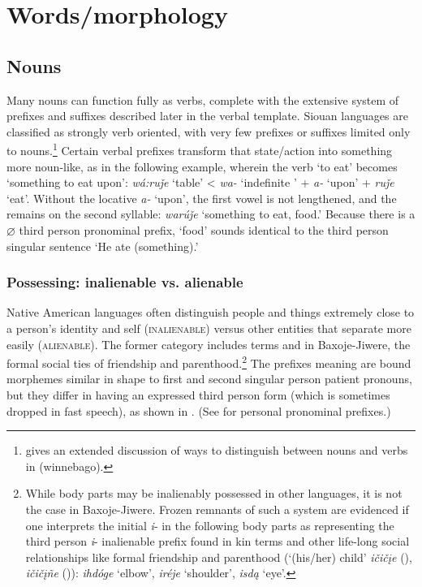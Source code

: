 \documentclass[output=paper]{LSP/langsci}
\begin{document}
\section{Words/morphology}
\subsection{Nouns}  
Many nouns can function fully as verbs, complete with the extensive system of prefixes and suffixes described later in the verbal template. Siouan languages are classified as strongly verb oriented, with very few prefixes or suffixes limited only to nouns.\footnote{\citet{Helmbrecht2002} gives an extended discussion of ways to distinguish between nouns and verbs in  (winnebago).} Certain verbal prefixes transform that state/action into something more noun-like, as in the following example, wherein the verb `to eat' becomes `something to eat upon':  \textit{wá:ru\v{j}e} `table' < \textit{wa-} `indefinite ' + \textit{a-} `upon' + \textit{ru\v{j}e} `eat'. Without the locative \textit{a-} `upon', the first vowel is not lengthened, and the  remains on the second syllable: \textit{warú\v{j}e} `something to eat, food.'  Because there is a $\varnothing$ third person pronominal prefix, `food' sounds identical to the third person singular sentence `He ate (something).'

\subsubsection{Possessing: inalienable vs. alienable} 
Native American languages often distinguish people and things extremely close to a person's identity and self (\textsc{inalienable}) versus other entities that separate more easily (\textsc{alienable}). The former category includes  terms and in Baxoje-Jiwere, the formal social ties of friendship and parenthood.\footnote{While body parts may be inalienably possessed in other languages, it is not the case in Baxoje-Jiwere. Frozen remnants of such a system are evidenced if one interprets the initial \textit{i}- in the following body parts as representing the third person \textit{i}- inalienable prefix found in kin terms and other life-long social relationships like formal friendship and parenthood (`(his/her) child' \textit{i\v{c}i\v{c}\k{i}e} (), \textit{i\v{c}i\v{c}\k{i}ñe} ()): \textit{ihdóge} `elbow', \textit{iréje} `shoulder', \textit{isd\k{a}} `eye'.} The prefixes meaning  are bound morphemes similar in shape to first and second singular person patient  pronouns, but they differ in having an expressed third person form (which is sometimes dropped in fast speech), as shown in . (See  for personal pronominal prefixes.)
\end{document}
